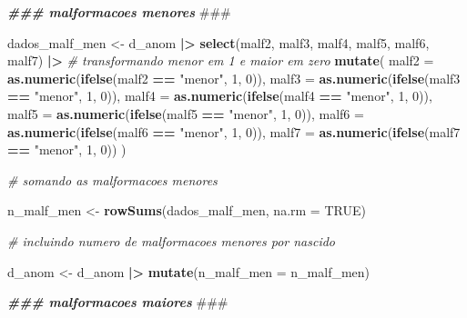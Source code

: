 \documentclass[
]{article}
\newenvironment{Shaded}{\begin{snugshade}}{\end{snugshade}}
\newcommand{\AlertTok}[1]{\textcolor[rgb]{0.94,0.16,0.16}{#1}}
\newcommand{\AttributeTok}[1]{\textcolor[rgb]{0.13,0.29,0.53}{#1}}
\newcommand{\CommentTok}[1]{\textcolor[rgb]{0.56,0.35,0.01}{\textit{#1}}}
\newcommand{\ConstantTok}[1]{\textcolor[rgb]{0.56,0.35,0.01}{#1}}
\newcommand{\DecValTok}[1]{\textcolor[rgb]{0.00,0.00,0.81}{#1}}
\newcommand{\DocumentationTok}[1]{\textcolor[rgb]{0.56,0.35,0.01}{\textbf{\textit{#1}}}}
\newcommand{\FunctionTok}[1]{\textcolor[rgb]{0.13,0.29,0.53}{\textbf{#1}}}
\newcommand{\NormalTok}[1]{#1}
\newcommand{\OtherTok}[1]{\textcolor[rgb]{0.56,0.35,0.01}{#1}}
\newcommand{\SpecialCharTok}[1]{\textcolor[rgb]{0.81,0.36,0.00}{\textbf{#1}}}
\newcommand{\StringTok}[1]{\textcolor[rgb]{0.31,0.60,0.02}{#1}}
\begin{document}
\begin{Shaded}
\begin{Highlighting}[]
\DocumentationTok{\#\#\# malformacoes menores }\AlertTok{\#\#\#}

\NormalTok{dados\_malf\_men }\OtherTok{\textless{}{-}}\NormalTok{ d\_anom }\SpecialCharTok{|\textgreater{}} 
  \FunctionTok{select}\NormalTok{(malf2, malf3, malf4, malf5, malf6, malf7) }\SpecialCharTok{|\textgreater{}} 
  \CommentTok{\# transformando \textquotesingle{}menor\textquotesingle{} em 1 e \textquotesingle{}maior\textquotesingle{} em zero}
  \FunctionTok{mutate}\NormalTok{(}
    \AttributeTok{malf2 =} \FunctionTok{as.numeric}\NormalTok{(}\FunctionTok{ifelse}\NormalTok{(malf2 }\SpecialCharTok{==} \StringTok{"menor"}\NormalTok{, }\DecValTok{1}\NormalTok{, }\DecValTok{0}\NormalTok{)),}
    \AttributeTok{malf3 =} \FunctionTok{as.numeric}\NormalTok{(}\FunctionTok{ifelse}\NormalTok{(malf3 }\SpecialCharTok{==} \StringTok{"menor"}\NormalTok{, }\DecValTok{1}\NormalTok{, }\DecValTok{0}\NormalTok{)),}
    \AttributeTok{malf4 =} \FunctionTok{as.numeric}\NormalTok{(}\FunctionTok{ifelse}\NormalTok{(malf4 }\SpecialCharTok{==} \StringTok{"menor"}\NormalTok{, }\DecValTok{1}\NormalTok{, }\DecValTok{0}\NormalTok{)),}
    \AttributeTok{malf5 =} \FunctionTok{as.numeric}\NormalTok{(}\FunctionTok{ifelse}\NormalTok{(malf5 }\SpecialCharTok{==} \StringTok{"menor"}\NormalTok{, }\DecValTok{1}\NormalTok{, }\DecValTok{0}\NormalTok{)),}
    \AttributeTok{malf6 =} \FunctionTok{as.numeric}\NormalTok{(}\FunctionTok{ifelse}\NormalTok{(malf6 }\SpecialCharTok{==} \StringTok{"menor"}\NormalTok{, }\DecValTok{1}\NormalTok{, }\DecValTok{0}\NormalTok{)),}
    \AttributeTok{malf7 =} \FunctionTok{as.numeric}\NormalTok{(}\FunctionTok{ifelse}\NormalTok{(malf7 }\SpecialCharTok{==} \StringTok{"menor"}\NormalTok{, }\DecValTok{1}\NormalTok{, }\DecValTok{0}\NormalTok{))}
\NormalTok{  )}

\CommentTok{\# somando as malformacoes menores}

\NormalTok{n\_malf\_men }\OtherTok{\textless{}{-}} \FunctionTok{rowSums}\NormalTok{(dados\_malf\_men, }\AttributeTok{na.rm =} \ConstantTok{TRUE}\NormalTok{)}

\CommentTok{\# incluindo numero de malformacoes menores por nascido}

\NormalTok{d\_anom }\OtherTok{\textless{}{-}}\NormalTok{ d\_anom }\SpecialCharTok{|\textgreater{}} 
  \FunctionTok{mutate}\NormalTok{(}\AttributeTok{n\_malf\_men =}\NormalTok{ n\_malf\_men)}

\DocumentationTok{\#\#\# malformacoes maiores }\AlertTok{\#\#\#}


\end{Highlighting}
\end{Shaded}
\end{document}
